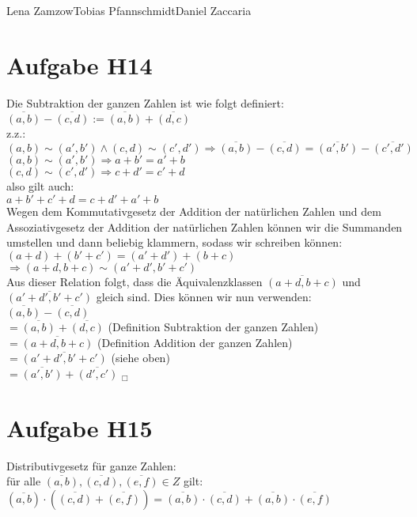 \documentclass[11pt,a4paper]{article}
\begin{document}
                {Lena Zamzow}{Tobias Pfannschmidt}{Daniel Zaccaria}{}{}


\section*{Aufgabe H14}
Die Subtraktion der ganzen Zahlen ist wie folgt definiert: \\
$\overline{(a,b)} - \overline{(c,d)} := \overline{(a,b)} + \overline{(d,c)}$ \\

z.z.: \\
$ (a,b) \sim (a',b') \land (c, d) \sim (c',d') \Rightarrow \overline{(a,b)} - \overline{(c,d)} = \overline{(a',b')} - \overline{(c',d')}$ \\

$(a,b) \sim (a',b') \Rightarrow a + b' = a' + b$ \\
$(c,d) \sim (c',d') \Rightarrow c + d' = c' + d$ \\
also gilt auch: \\
$ a + b' + c' + d = c + d' + a' + b$ \\
Wegen dem Kommutativgesetz der Addition der natürlichen Zahlen und dem Assoziativgesetz der Addition der natürlichen Zahlen können wir die Summanden umstellen und dann beliebig klammern, sodass wir schreiben können: \\
$ (a+d) + (b'+c') = (a'+d') + (b+c)$
$\Rightarrow (a+d, b+c) \sim (a'+d', b'+c')$ \\
Aus dieser Relation folgt, dass die Äquivalenzklassen $\overline{(a+d,b+c)}$ und $\overline{(a'+d',b'+c')}$ gleich sind. Dies können wir nun verwenden: \\

$\overline{(a,b)} - \overline{(c,d)}$ \\
$= \overline{(a,b)} + \overline{(d,c)}$   (Definition Subtraktion der ganzen Zahlen) \\
$= \overline{(a+d,b+c)}$   (Definition Addition der ganzen Zahlen) \\
$= \overline{(a'+d',b'+c')}$   (siehe oben) \\
$= \overline{(a',b')} + \overline{(d',c')}$   $_\Box$

\section*{Aufgabe H15}
Distributivgesetz für ganze Zahlen: \\
für alle $\overline{(a,b)}, \overline{(c,d)}, \overline{(e,f)} \in Z$ gilt:\\
$ (\overline{a,b}) \cdot ( \overline{(c,d)} + \overline{(e,f)} ) = \overline{(a,b)} \cdot \overline{(c,d)} + \overline{(a,b)} \cdot \overline{(e,f)}$\\
\end{document}
